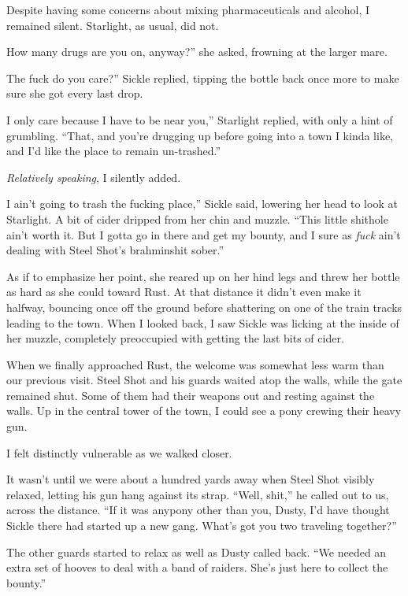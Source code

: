 Despite having some concerns about mixing pharmaceuticals and alcohol, I remained silent. Starlight, as usual, did not.

\leavevmode{}How many drugs are you on, anyway?” she asked, frowning at the larger mare.

\leavevmode{}The fuck do you care?” Sickle replied, tipping the bottle back once more to make sure she got every last drop.

\leavevmode{}I only care because I have to be near you,” Starlight replied, with only a hint of grumbling. “That, and you’re drugging up before going into a town I kinda like, and I’d like the place to remain un-trashed.”

\textit{Relatively speaking}, I silently added.

\leavevmode{}I ain’t going to trash the fucking place,” Sickle said, lowering her head to look at Starlight. A bit of cider dripped from her chin and muzzle. “This little shithole ain’t worth it. But I gotta go in there and get my bounty, and I sure as \textit{fuck} ain’t dealing with Steel Shot’s brahminshit sober.”

As if to emphasize her point, she reared up on her hind legs and threw her bottle as hard as she could toward Rust. At that distance it didn’t even make it halfway, bouncing once off the ground before shattering on one of the train tracks leading to the town. When I looked back, I saw Sickle was licking at the inside of her muzzle, completely preoccupied with getting the last bits of cider.

When we finally approached Rust, the welcome was somewhat less warm than our previous visit. Steel Shot and his guards waited atop the walls, while the gate remained shut. Some of them had their weapons out and resting against the walls. Up in the central tower of the town, I could see a pony crewing their heavy gun.

I felt distinctly vulnerable as we walked closer.

It wasn’t until we were about a hundred yards away when Steel Shot visibly relaxed, letting his gun hang against its strap. “Well, shit,” he called out to us, across the distance. “If it was anypony other than you, Dusty, I’d have thought Sickle there had started up a new gang. What’s got you two traveling together?”

The other guards started to relax as well as Dusty called back. “We needed an extra set of hooves to deal with a band of raiders. She’s just here to collect the bounty.”


